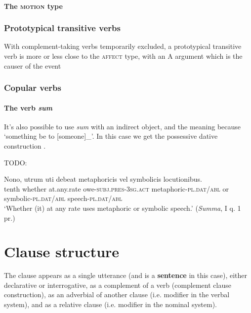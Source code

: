 \documentclass[a4paper, oneside, 12pt]{report}
\newcommand*{\citesec}[1]{\S~{#1}}
\newcommand*{\concept}[1]{\textbf{#1}}
\newcommand{\form}[1]{\emph{#1}}
\newcommand*{\category}[1]{\textsc{#1}}
\newcommand{\translate}[1]{`#1'}
\newcommand{\classify}[1]{{\textsc{#1}}}
\newcommand{\literature}[1]{\textit{#1}}
\begin{document}
\subsubsection{The \classify{motion} type}


\subsection{Prototypical transitive verbs}\label{sec:prototypical-transitive}

With complement-taking verbs temporarily excluded,
a prototypical transitive verb is more or less close to the \classify{affect} type,
with an A argument which is the causer of the event 

\subsection{Copular verbs}

\subsubsection{The verb \form{sum}}\label{sec:sum}

It's also possible to use \form{sum} with an indirect object, 
and the meaning because \translate{something be to [someone]_{}}.
In this case we get the possessive dative construction
\citep[\citesec{373}]{allen1903allen}.

TODO: 

\begin{exe}
    \ex \gll Nono, utrum uti debeat metaphoricis vel symbolicis locutionibus. \\
    tenth whether at.any.rate owe-\category{subj}.\category{pres}-\category{3sg}.\category{act}  
    metaphoric-\category{pl.dat/abl} or symbolic-\category{pl.dat/abl} 
    speech-\category{pl.dat/abl} \\
    \glt \translate{Whether (it) at any rate uses metaphoric or symbolic speech.} (\literature{Summa}, I q. 1 pr.)
\end{exe}

\chapter{Clause structure}

The clause appears as a single utterance 
(and is a \concept{sentence} in this case),
either declarative or interrogative,
as a complement of a verb (complement clause construction),
as an adverbial of another clause
(i.e. modifier in the verbal system),
and as a relative clause 
(i.e. modifier in the nominal system).
\end{document}
